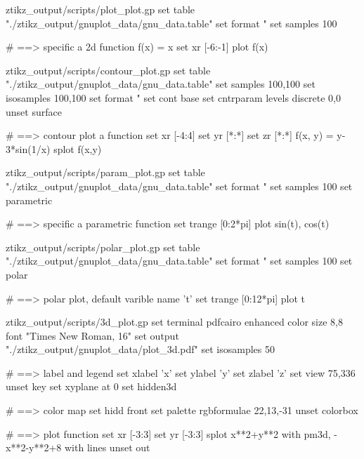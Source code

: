 \ExplSyntaxOff
\begingroup\newif\ifgnuscript
{}

\ifgnuscript
{}
\begin{filecontents}[noheader]{ztikz_output/scripts/plot_plot.gp}
set table "./ztikz_output/gnuplot_data/gnu_data.table"
set format "%
set samples 100


# ==> specific a 2d function
f(x) = x
set xr [-6:-1]
plot f(x)
\end{filecontents}

\begin{filecontents}[noheader]{ztikz_output/scripts/contour_plot.gp}
set table "./ztikz_output/gnuplot_data/gnu_data.table"
set samples 100,100
set isosamples 100,100
set format "%
set cont base
set cntrparam levels discrete 0,0
unset surface


# ==> contour plot a function
set xr [-4:4]
set yr [*:*]
set zr [*:*]
f(x, y) = y-3*sin(1/x)
splot f(x,y)
\end{filecontents}

\begin{filecontents}[noheader]{ztikz_output/scripts/param_plot.gp}
set table "./ztikz_output/gnuplot_data/gnu_data.table"
set format "%
set samples 100
set parametric


# ==> specific a parametric function
set trange [0:2*pi]
plot sin(t), cos(t)  
\end{filecontents}

\begin{filecontents}[noheader]{ztikz_output/scripts/polar_plot.gp}
set table "./ztikz_output/gnuplot_data/gnu_data.table"
set format "%
set samples 100
set polar


# ==> polar plot, default varible name 't'
set trange [0:12*pi]
plot t
\end{filecontents}

\begin{filecontents}[noheader]{ztikz_output/scripts/3d_plot.gp}
set terminal pdfcairo enhanced color size 8,8 font "Times New Roman, 16"
set output "./ztikz_output/gnuplot_data/plot_3d.pdf"
set isosamples 50


# ==> label and legend
set xlabel 'x'
set ylabel 'y'
set zlabel 'z'
set view 75,336
unset key
set xyplane at 0
set hidden3d


# ==> color map
set hidd front
set palette rgbformulae 22,13,-31
unset colorbox


# ==> plot function
set xr [-3:3]
set yr [-3:3]
splot x**2+y**2 with pm3d, -x**2-y**2+8 with lines
unset out 
\end{filecontents}
\fi\endgroup\ExplSyntaxOn